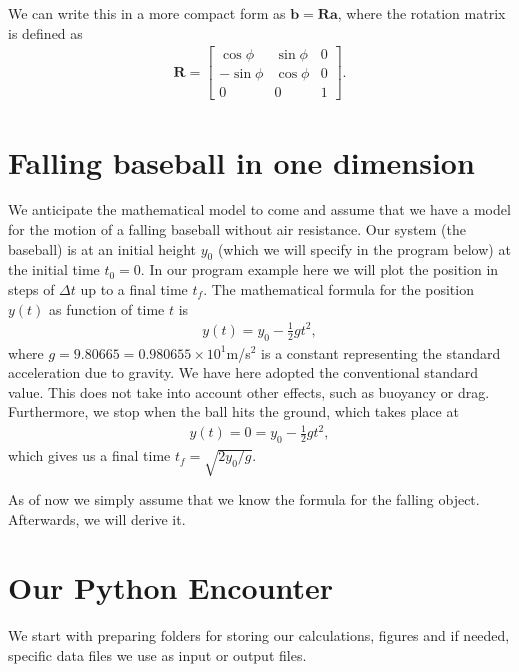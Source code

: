 \documentclass[letterpaper,10pt,english]{sphinxmanual}
\begin{document}
We can write this in a more compact form as \(\boldsymbol{b} = \boldsymbol{R}\boldsymbol{a}\), where the rotation matrix is defined as
\begin{equation*}
\begin{split}
\boldsymbol{R} = \begin{bmatrix} \cos{\phi} & \sin{\phi} & 0 \\ -\sin{\phi} & \cos{\phi} & 0 \\ 0 & 0 & 1\end{bmatrix}.
\end{split}
\end{equation*}

\section{Falling baseball in one dimension}
\label{\detokenize{chapter1:falling-baseball-in-one-dimension}}
We anticipate the mathematical model to come and assume that we have a
model for the motion of a falling baseball without air resistance.
Our system (the baseball) is at an initial height \(y_0\) (which we will
specify in the program below) at the initial time \(t_0=0\). In our program example here we will plot the position in steps of \(\Delta t\) up to a final time \(t_f\).
The mathematical formula for the position \(y(t)\) as function of time \(t\) is
\begin{equation*}
\begin{split}
y(t) = y_0-\frac{1}{2}gt^2,
\end{split}
\end{equation*}
where \(g=9.80665=0.980655\times 10^1\)m/s\({}^2\) is a constant representing the standard acceleration due to gravity.
We have here adopted the conventional standard value. This does not take into account other effects, such as buoyancy or drag.
Furthermore, we stop when the ball hits the ground, which takes place at
\begin{equation*}
\begin{split}
y(t) = 0= y_0-\frac{1}{2}gt^2,
\end{split}
\end{equation*}
which gives us a final time \(t_f=\sqrt{2y_0/g}\).

As of now we simply assume that   we know the formula for the falling object. Afterwards, we will derive it.


\section{Our Python Encounter}
\label{\detokenize{chapter1:our-python-encounter}}
We start with preparing folders for storing our calculations, figures and if needed, specific data files we use as input or output files.
\end{document}
